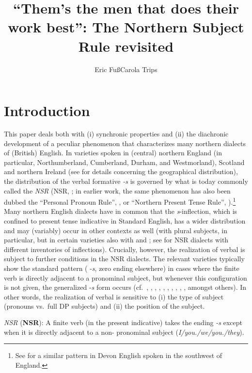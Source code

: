 \documentclass[output=paper]{langsci/langscibook}
\author{Eric Fuß\affiliation{Ruhr University Bochum}\lastand Carola
Trips\affiliation{University of Mannheim}}
\title{“Them’s the men that does their work best”: The Northern Subject Rule
revisited}
\begin{document}
\glsresetall

\section{Introduction}\label{sec:intro}

This paper deals both with (i) synchronic properties and (ii) the diachronic
development of a peculiar  phenomenon that characterizes many northern
dialects of (British) English. In varieties spoken in (central) northern
England (in particular, Northumberland, Cumberland, Durham, and Westmorland),
Scotland and northern Ireland (see \citealt{Pietsch:2005a,Pietsch:2005b} for
details concerning the geographical distribution), the distribution of the
verbal  formative \emph{-s} is governed by what is today commonly
called the \emph{\glsdesc{NSR}} (\gls{NSR},
\citealt[221]{Ihalainen:1994}; in earlier work, the same phenomenon has also
been dubbed the ``Personal Pronoun Rule'', \citealt{McIntosh:1988}, or ``Northern
Present Tense Rule'', \citealt{Montgomery:1994}).\footnote{See
\cite{GodfreyTagliamonte:1999} for a similar pattern in Devon English spoken in
the southwest of England.} Many northern English dialects have in common that
the \emph{s}-inflection, which is confined to \Tsg{} present tense indicative in
Standard English, has a wider distribution and may (variably) occur in other
contexts as well (with plural subjects, in particular, but in certain varieties
also with \Fsg{} and \Ssg{}; see \citealt{Pietsch:2005a,Pietsch:2005b} for \gls{NSR}
dialects with different inventories of inflections). Crucially, however, the
realization of verbal  is subject to further conditions in the \gls{NSR}
dialects. The relevant varieties typically show the standard  pattern
(\Tsg{} -\emph{s}, zero ending elsewhere) in cases where the finite verb is
directly adjacent to a pronominal subject, but whenever this configuration is
not given, the generalized -\emph{s} form occurs (cf.\ \citealt{Murray:1873},
\citealt{Berndt1956}, \citealt{McIntosh:1988}, \citealt{Montgomery:1994},
\citealt{Schendl:1996b}, \citealt{Corrigan:1997},
\citealt{Boerjarschapman:1998}, \citealt{Klemola:2000},
\citealt{Pietsch:2005a,Pietsch:2005b}, \citealt{deHaas:2011}, amongst others).
In other words, the realization of verbal  is sensitive to (i) the
type of subject (pronouns vs.\ full DP subjects) and (ii) the position of the
subject.

\ea \textit{\glsdesc{NSR}} (\textbf{\gls{NSR}}): A finite verb
  (in the present indicative) takes the ending \emph{-s} except when it is
  directly adjacent to a non-\Tsg{} pronominal subject
  (\emph{I/you.\Sg/we/you.\Pl/they}).
\z
\end{document}
